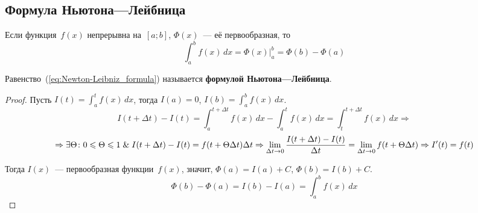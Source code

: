 \subsection{Формула Ньютона---Лейбница}
\begin{theorem}
Если функция~$f(x)$ непрерывна на~$[a; b]$, $\Phi(x)$~--- её первообразная, то
\begin{equation}
\label{eq:Newton-Leibniz_formula}
\int_a^b f(x)\,dx = \left. \Phi(x) \right|_a^b = \Phi(b) - \Phi(a)
\end{equation}
\end{theorem}
 Равенство~(\ref{eq:Newton-Leibniz_formula}) называется \textbf{формулой Ньютона---Лейбница}.
\begin{proof}
Пусть $\displaystyle I(t) = \int_a^t f(x)\,dx$, тогда $I(a) = 0$, $\displaystyle I(b) = \int_a^b f(x)\,dx$.
\begin{equation*}
I(t + \Delta t) - I(t) =
\int_a^{t+\Delta t} f(x)\,dx - \int_a^t f(x)\,dx =
\int_t^{t + \Delta t} f(x)\,dx \Rightarrow
\end{equation*}
\begin{equation*}
\Rightarrow \exists \Theta \colon 0 \leqslant \Theta \leqslant 1 \mathrel{\&} I(t + \Delta t) - I(t) = f(t + \Theta \Delta t) \Delta t \Rightarrow
\lim_{\Delta t \to 0} \frac{I(t + \Delta t) - I(t)}{\Delta t} = \lim_{\Delta t \to 0} f(t + \Theta \Delta t) \Rightarrow
I'(t) = f(t)
\end{equation*}

Тогда $I(x)$~--- первообразная функции~$f(x)$, значит, $\Phi(a) = I(a) + C$, $\Phi(b) = I(b) + C$.
\begin{equation*}
\Phi(b) - \Phi(a) = I(b) - I(a) = \int_a^b f(x)\,dx
\end{equation*}
\end{proof}